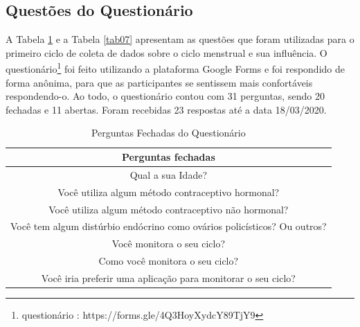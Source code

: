 \subsection{Questões do Questionário}

A Tabela \ref{tab06} e a Tabela \ref{tab07} apresentam as questões que foram utilizadas para o primeiro ciclo de coleta de dados sobre o ciclo menstrual e 
sua influência. O questionário\footnote{questionário : https://forms.gle/4Q3HoyXydcY89TjY9} foi feito utilizando a plataforma Google Forms e foi respondido de forma anônima, para que as
participantes se sentissem mais confortáveis respondendo-o. Ao todo, o questionário contou com 31 perguntas, sendo 20 fechadas e 
11 abertas. Foram recebidas 23 respostas até a data 18/03/2020.

\begin{table}[h]
	\centering
	\caption{Perguntas Fechadas do Questionário}
	\label{tab06}
	\begin{tabular}{c}
		\toprule
		\textbf{Perguntas fechadas} \\
        \midrule
        \begin{minipage} [t] {1\textwidth} Qual a sua Idade?  \end{minipage} \\
        \midrule
        \begin{minipage} [t] {1\textwidth} Você utiliza algum método contraceptivo hormonal?   \end{minipage}\\
        \midrule
        \begin{minipage} [t] {1\textwidth} Você utiliza algum método contraceptivo não hormonal?  \end{minipage} \\
        \midrule
        \begin{minipage} [t] {1\textwidth}  Você tem algum distúrbio endócrino como ovários policísticos? Ou outros? \end{minipage}  \\
        \midrule
        \begin{minipage} [t] {1\textwidth}  Você monitora o seu ciclo? \end{minipage}\\
        \midrule
        \begin{minipage} [t] {1\textwidth}  Como você monitora o seu ciclo? \end{minipage} \\
        \midrule
        \begin{minipage} [t] {1\textwidth}  Você iria preferir uma aplicação para monitorar o seu ciclo?\end{minipage}\\

\end{tabular}
\end{table}
